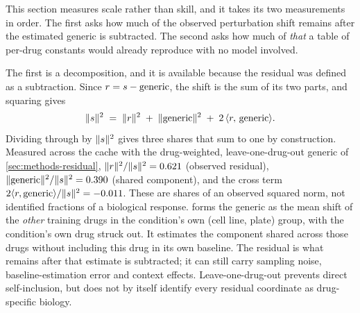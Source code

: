 \noindent
This section measures scale rather than skill, and it takes its two measurements in order. The
first asks how much of the observed perturbation shift remains after the
estimated generic is subtracted. The second
asks how much of \emph{that} a table of per-drug constants would already reproduce
with no model involved.

The first is a decomposition, and it is available because the residual was defined
as a subtraction.  Since $r = s - \textrm{generic}$, the shift is the sum
of its two parts, and squaring gives
\begin{equation}
 \lVert s \rVert^{2}
 \;=\; \lVert r \rVert^{2}
 \;+\; \lVert \textrm{generic} \rVert^{2}
 \;+\; 2\,\langle r,\, \textrm{generic} \rangle .
\end{equation}
Dividing through by $\lVert s \rVert^{2}$ gives three shares that sum to one
by construction. Measured across the cache with the drug-weighted, leave-one-drug-out generic of \cref{sec:methods-residual},
$\lVert r \rVert^{2} / \lVert s \rVert^{2} = 0.621$ (observed residual),
$\lVert \textrm{generic} \rVert^{2} / \lVert s \rVert^{2} = 0.390$ (shared component), and the
cross term $2\langle r, \textrm{generic}\rangle / \lVert s \rVert^{2}
= -0.011$. These are shares of an observed squared norm, not identified
fractions of a biological response.  forms the generic
as the mean shift of the \emph{other} training drugs in the condition's own
(cell line, plate) group, with the condition's own drug struck out. It estimates
the component shared across those drugs without including this drug in its own
baseline. The residual is what remains after that estimate is subtracted; it can
still carry sampling noise, baseline-estimation error and context effects.
Leave-one-drug-out prevents direct self-inclusion, but does not by itself
identify every residual coordinate as drug-specific biology.

